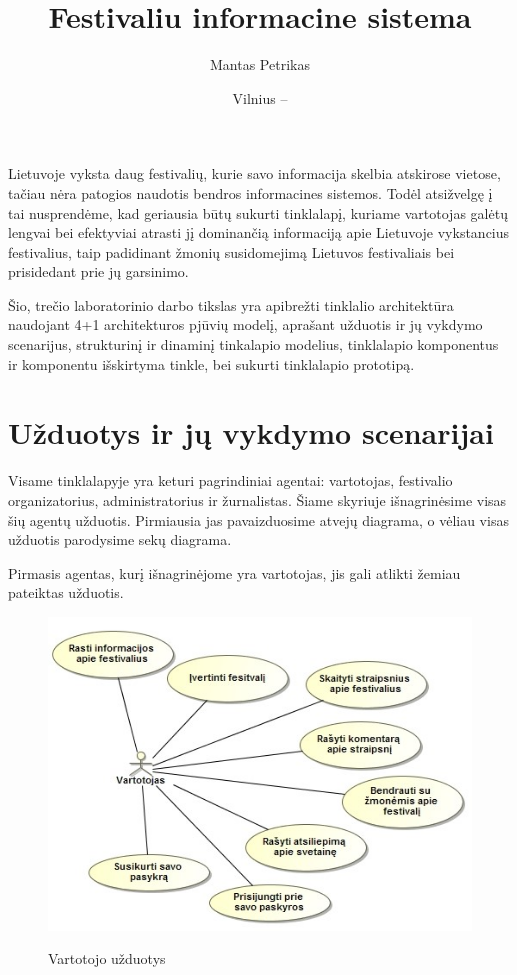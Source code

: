 ﻿\documentclass{VUMIFPSkursinis}
\title{Festivaliu informacine sistema}
\author{Mantas Petrikas}
\date{Vilnius – \the\year}
\begin{document}
\maketitle

\tableofcontents


Lietuvoje vyksta daug festivalių, kurie savo informacija skelbia atskirose vietose, tačiau nėra patogios naudotis bendros informacines sistemos. 
Todėl atsižvelgę į tai nusprendėme, kad geriausia būtų sukurti tinklalapį, kuriame vartotojas galėtų lengvai bei efektyviai atrasti jį dominančią informaciją apie Lietuvoje vykstancius festivalius, taip padidinant žmonių susidomejimą Lietuvos festivaliais bei prisidedant prie jų garsinimo.

Šio, trečio laboratorinio darbo tikslas yra apibrežti tinklalio architektūra naudojant 4+1 architekturos pjūvių modelį, aprašant užduotis ir jų vykdymo scenarijus, strukturinį ir dinaminį tinkalapio modelius, tinklalapio komponentus ir komponentu išskirtyma tinkle, bei sukurti tinklalapio prototipą.  

\section{Užduotys ir jų vykdymo scenarijai}
Visame tinklalapyje yra keturi pagrindiniai agentai: vartotojas, festivalio organizatorius, administratorius ir žurnalistas. Šiame skyriuje išnagrinėsime visas šių agentų užduotis. Pirmiausia jas pavaizduosime atvejų diagrama, o vėliau visas užduotis parodysime sekų diagrama. 

Pirmasis agentas, kurį išnagrinėjome yra vartotojas, jis gali atlikti žemiau pateiktas užduotis.

\begin{figure}[H]
    \centering
    \includegraphics[scale=0.45]{img/Pav/Vartotojas}
    \label{img:uml1}
	\caption{Vartotojo užduotys}
\end{figure}
\end{document}
